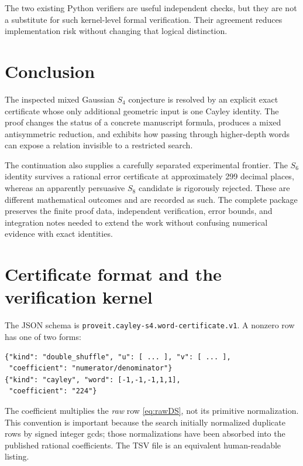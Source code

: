 \documentclass[11pt,letterpaper]{article}
\numberwithin{equation}{section}
\theoremstyle{definition}
\begin{document}
The two existing Python verifiers are useful independent checks, but
they are not a substitute for such kernel-level formal verification.
Their agreement reduces implementation risk without changing that
logical distinction.

\section{Conclusion}
The inspected mixed Gaussian $S_4$ conjecture is resolved by an explicit
exact certificate whose only additional geometric input is one Cayley
identity. The proof changes the status of a concrete manuscript formula,
produces a mixed antisymmetric reduction, and exhibits how passing
through higher-depth words can expose a relation invisible to a
restricted search.

The continuation also supplies a carefully separated experimental
frontier. The $S_6$ identity survives a rational error certificate at
approximately 299 decimal places, whereas an apparently persuasive
$S_8$ candidate is rigorously rejected. These are different mathematical
outcomes and are recorded as such. The complete package preserves the
finite proof data, independent verification, error bounds, and
integration notes needed to extend the work without confusing numerical
evidence with exact identities.

\appendix
\section{Certificate format and the verification kernel}
\label{app:certificate}

The JSON schema is \texttt{proveit.cayley-s4.word-certificate.v1}. A
nonzero row has one of two forms:
\begin{lstlisting}
{"kind": "double_shuffle", "u": [ ... ], "v": [ ... ],
 "coefficient": "numerator/denominator"}
{"kind": "cayley", "word": [-1,-1,-1,1,1],
 "coefficient": "224"}
\end{lstlisting}
The coefficient multiplies the \emph{raw} row \eqref{eq:rawDS}, not
its primitive normalization. This convention is important because the
search initially normalized duplicate rows by signed integer gcds;
those normalizations have been absorbed into the published rational
coefficients. The TSV file is an equivalent human-readable listing.
\end{document}
